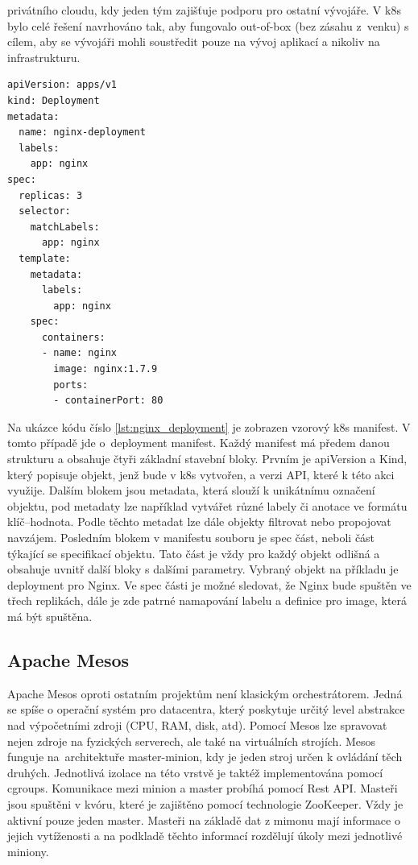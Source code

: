 privátního cloudu, kdy jeden tým zajišťuje podporu pro ostatní vývojáře. V k8s bylo celé řešení navrhováno tak, aby fungovalo out-of-box (bez zásahu z venku) s cílem, aby se vývojáři mohli soustředit pouze na vývoj aplikací a nikoliv na infrastrukturu.

\begin{lstlisting}[caption={Kubernetes Manifest - Nginx deployment, zdroj: \cite{k8s_docs_deployment}},label={lst:nginx_deployment}]
apiVersion: apps/v1
kind: Deployment
metadata:
  name: nginx-deployment
  labels:
    app: nginx
spec:
  replicas: 3
  selector:
    matchLabels:
      app: nginx
  template:
    metadata:
      labels:
        app: nginx
    spec:
      containers:
      - name: nginx
        image: nginx:1.7.9
        ports:
        - containerPort: 80
\end{lstlisting}

Na ukázce kódu číslo \ref{lst:nginx_deployment} je zobrazen vzorový k8s manifest. V tomto případě jde o deployment manifest. Každý manifest má předem danou strukturu a obsahuje čtyři základní stavební bloky. Prvním je apiVersion a Kind, který popisuje objekt, jenž bude v k8s vytvořen, a verzi API, které k této akci využije. Dalším blokem jsou metadata, která slouží k unikátnímu označení objektu, pod metadaty lze například vytvářet různé labely či anotace ve formátu klíč–hodnota. Podle těchto metadat lze dále objekty filtrovat nebo propojovat navzájem. Posledním blokem v manifestu souboru je spec část, neboli část týkající se specifikací objektu. Tato část je vždy pro každý objekt odlišná a obsahuje uvnitř další bloky s dalšími parametry. Vybraný objekt na příkladu je deployment pro Nginx. Ve spec části je možné sledovat, že Nginx bude spuštěn ve třech replikách, dále je zde patrné namapování labelu a definice pro image, která má být spuštěna.

\subsection{Apache Mesos}
Apache Mesos oproti ostatním projektům není klasickým orchestrátorem. Jedná se spíše o operační systém pro datacentra, který poskytuje určitý level abstrakce nad výpočetními zdroji (CPU, RAM, disk, atd). Pomocí Mesos lze spravovat nejen zdroje na fyzických serverech, ale také na virtuálních strojích. Mesos funguje na architektuře master-minion, kdy je jeden stroj určen k ovládání těch druhých. Jednotlivá izolace na této vrstvě je taktéž implementována pomocí cgroups. Komunikace mezi minion a master probíhá pomocí Rest API. Masteři jsou spuštěni v kvóru, které je zajištěno pomocí technologie ZooKeeper. Vždy je aktivní pouze jeden master. Masteři na základě dat z mimonu mají informace o jejich vytíženosti a na podkladě těchto informací rozdělují úkoly mezi jednotlivé miniony.

